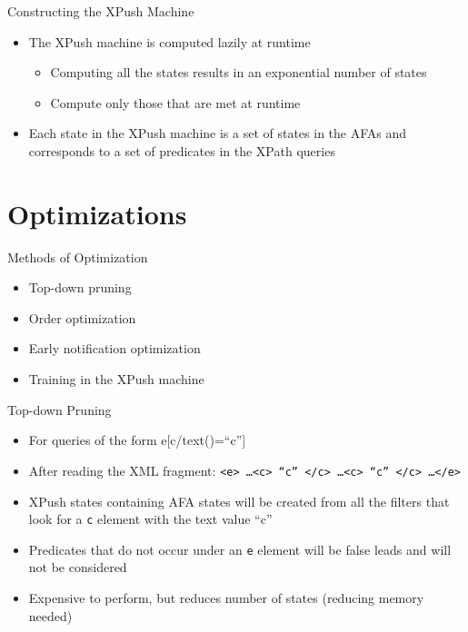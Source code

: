 \documentclass[mathserif,serif]{beamer}
\begin{document}
\begin{frame}{Constructing the XPush Machine}
  \begin{itemize}
    \item The XPush machine is computed lazily at runtime
    \begin{itemize}
      \item Computing all the states results in an exponential number of states
      \item Compute only those that are met at runtime
    \end{itemize}
    \item Each state in the XPush machine is a set of states in the AFAs and corresponds to a set of predicates in the XPath queries 
  \end{itemize}
\end{frame}

\section{Optimizations}
\begin{frame}{Methods of Optimization}
  \begin{itemize}
    \item Top-down pruning
    \item Order optimization
    \item Early notification optimization
    \item Training in the XPush machine
  \end{itemize}
\end{frame}

\begin{frame}{Top-down Pruning}
  \begin{itemize}
    \item For queries of the form e[c/text()=``c'']
    \item After reading the XML fragment: \texttt{<e> \dots <c> ``c'' </c> \dots <c> ``c'' </c> \dots </e>}
    \item XPush states containing AFA states will be created from all the filters that look for a \texttt{c} element with the text value ``c'' 
    \item Predicates that do not occur under an \texttt{e} element will be false leads and will not be considered
    \item Expensive to perform, but reduces number of states (reducing memory needed)
  \end{itemize}
\end{frame}
\end{document}
